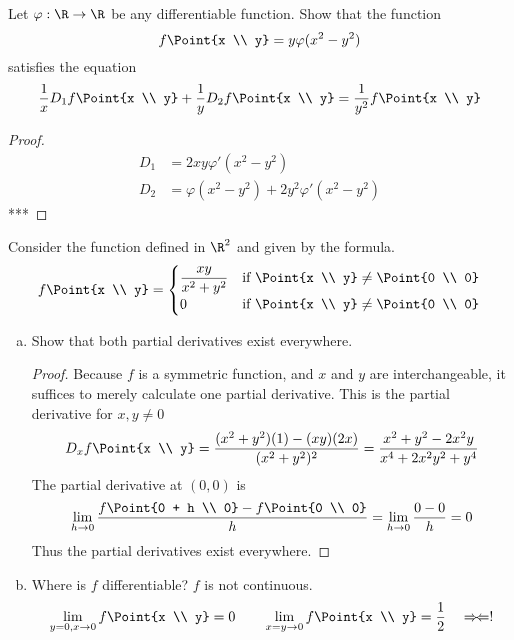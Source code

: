 
 Let $\varphi : \R \to \R$ be any differentiable function. Show that the function
\[f\Point{x \\ y} = y\varphi (x^2-y^2)\]
satisfies the equation
\[\frac{1}{x}D_1f\Point{x \\ y}+\frac{1}{y}D_2f\Point{x \\ y}=\frac{1}{y^2}f\Point{x \\ y}\]

\begin{proof}
  \begin{align*}
  D_1 &= 2xy\varphi'(x^2-y^2) \\
  D_2 &= \varphi(x^2-y^2) + 2y^2 \varphi'(x^2-y^2)
\end{align*}
***
 \end{proof}

 Consider the function defined in $\R^2$ and given by the formula.
\[f\Point{x \\ y} = \begin{cases}
\displaystyle \frac{xy}{x^2+y^2} &\text{if } \Point{x \\ y}\neq \Point{0 \\ 0} \\
0 &\text{if } \Point{x \\ y}\neq \Point{0 \\ 0}
\end{cases}\]
\begin{enumerate}[a.]
  \item Show that both partial derivatives exist everywhere.

  \begin{proof}
    Because $f$ is a symmetric function, and $x$ and $y$ are interchangeable, it suffices to merely calculate one partial derivative. This is the partial derivative for $x,y\neq 0$
    \[D_xf\Point{x \\ y} = \frac{(x^2+y^2)(1)-(xy)(2x)}{(x^2+y^2)^2} = \frac{x^2+y^2-2x^2y}{x^4+2x^2y^2+y^4}\]
    The partial derivative at $(0,0)$ is
    \[\lim_{h\to 0} \frac{f\Point{0 + h \\ 0} - f\Point{0 \\ 0}}{h} = \lim_{h\to 0} \frac{0 - 0}{h} = 0\]
    Thus the partial derivatives exist everywhere.
  \end{proof}

  \item Where is $f$ differentiable?
  $f$ is not continuous.
  \[\lim_{y=0, x\to 0} f\Point{x \\ y} = 0 \qquad \lim_{x=y \to 0}f\Point{x \\ y} = \frac{1}{2} \quad \Rightarrow\!\Leftarrow !\]
\end{enumerate}

